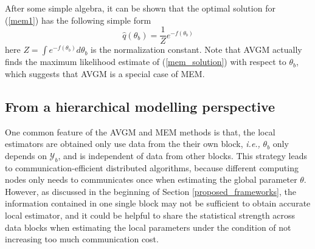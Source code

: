 \documentclass{article}
\newcommand{\ie}[0]{\emph{i.e., }}
\newcommand{\eg}[0]{\emph{e.g., }}
\newcommand{\1}[0]{\ensuremath{\boldsymbol{1}}\xspace}
\begin{document}
After some simple algebra, it can be shown that the optimal solution for (\ref{mem1}) has the following simple form
\begin{equation}\label{mem_solution}
\textstyle \hat q(\theta_b) = \frac{1}{Z}e^{-f(\theta_b)}
\end{equation}
here $Z = \int e^{-f(\theta_b)} d\theta_b$ is the normalization constant. Note that AVGM actually finds the maximum likelihood estimate of (\ref{mem_solution}) with respect to $\theta_b$, which suggests that AVGM is a special case of MEM.


\subsection{From a hierarchical modelling perspective}\label{HM}

One common feature of the AVGM and MEM methods is that, the local estimators are obtained only use data from the their own block, \ie $\theta_b$ only depends on $\mathcal{Y}_b$, and is independent of data from other blocks. This strategy leads to communication-efficient distributed algorithms, because different computing nodes only needs to communicates once when estimating the global parameter $\theta$. However, as discussed in the beginning of Section \ref{proposed_frameworks}, the information contained in one single block may not be sufficient to obtain accurate local estimator, and it could be helpful to share the statistical strength across data blocks when estimating the local parameters under the condition of not increasing too much communication cost.

\end{document}
